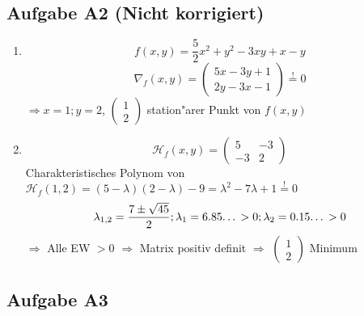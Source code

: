 \documentclass[fleqn,13pt]{scrartcl}
\begin{document}
\subsection*{Aufgabe A2 (Nicht korrigiert)}
\begin{enumerate}
	\item
		\begin{equation*}
			f(x,y) = \frac52x^2 + y^2 -3xy + x - y
		\end{equation*}
		\begin{equation*}
			\nabla_f(x,y) = 
			\begin{pmatrix}
				5x - 3y + 1\\
				2y - 3x - 1
			\end{pmatrix} \overset{!}{=} 0
		\end{equation*}
	$\Rightarrow x = 1; y = 2$, $\begin{pmatrix}1 \\2\end{pmatrix}$ station"arer Punkt von $f(x,y)$

	\item
		\begin{equation*}
			\mathcal{H}_f(x,y) =
			\begin{pmatrix}
				5 & -3 \\
				-3 & 2
			\end{pmatrix}
		\end{equation*}
		Charakteristisches Polynom von $\mathcal{H}_f(1,2) = (5-\lambda)(2-\lambda)-9 = \lambda^2 - 7\lambda + 1 \overset{!}{=} 0$
		\begin{equation*}
			\lambda_{1,2} = \frac{7 \pm \sqrt{45}}2; \lambda_1 = 6.85\text{\dots} > 0; \lambda_2 = 0.15\text{\dots} > 0
		\end{equation*}
	$\Rightarrow$ Alle EW $>0$ $\Rightarrow$ Matrix positiv definit $\Rightarrow$ $\begin{pmatrix}1\\2\end{pmatrix}$ Minimum


\end{enumerate}

\subsection*{Aufgabe A3}
\end{document}

